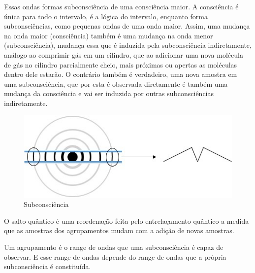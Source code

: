 Essas ondas formas subconsciência de uma consciência maior. A consciência é única para todo o intervalo, é a lógica do intervalo, enquanto forma subconsciências, como pequenas ondas de uma onda maior. Assim, uma mudança na onda maior (consciência) também é uma mudança na onda menor (subconsciência), mudança essa que é induzida pela subconsciência indiretamente, análogo ao comprimir gás em um cilindro, que ao adicionar uma nova molécula de gás no cilindro parcialmente cheio, mais próximas ou apertas as moléculas dentro dele estarão. O contrário também é verdadeiro, uma nova amostra em uma subconsciência, que por esta é observada diretamente é também uma mudança da consciência e vai ser induzida por outras subconsciências indiretamente.
\begin{figure}[H]
\caption{Subconsciência}
\label{fig:consciousness_subconscious}
\centering
\includegraphics[scale=1]{sections/images/consciousness_subconscious.jpg}
\end{figure}

O salto quântico é uma reordenação feita pelo entrelaçamento quântico a medida que as amostras dos agrupamentos mudam com a adição de novas amostras.

Um agrupamento é o range de ondas que uma subconsciência é capaz de observar. E esse range de ondas depende do range de ondas que a própria subconsciência é constituída. 

